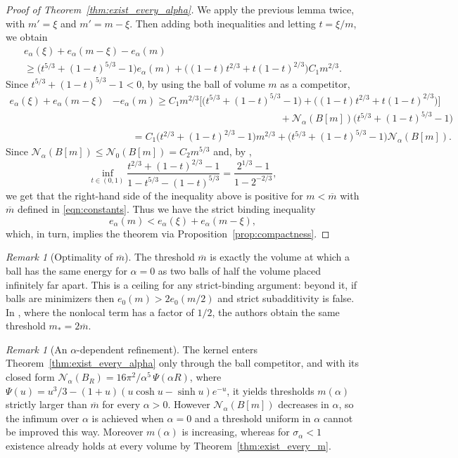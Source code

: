 \documentclass[a4paper,11pt,reqno]{amsart}
\numberwithin{equation}{section}
\theoremstyle{remark}
\newtheorem{remark}[theorem]{Remark}
\theoremstyle{definition}
\renewcommand{\bar}[1]{\overline{#1}}
\newcommand{\nl}{\mathcal{N}_{\alpha}}
\renewcommand{\leq}{\leqslant}
\renewcommand{\geq}{\geqslant}
\newcommand{\calN}{\mathcal{N}}
\begin{document}
\begin{proof}[Proof of Theorem~\ref{thm:exist_every_alpha}]
We apply the previous lemma twice, with $m'=\xi$ and $m'=m-\xi$. Then adding both inequalities and letting $t=\xi/m$, we obtain
	\begin{multline*}
		e_\alpha(\xi)+e_\alpha(m-\xi)-e_\alpha(m) \\ \geq \big(t^{5/3}+(1-t)^{5/3}-1\big)e_\alpha(m) + \big((1-t)t^{2/3}+t(1-t)^{2/3}\big)C_1 m^{2/3}.
	\end{multline*}
Since $t^{5/3}+(1-t)^{5/3}-1<0$, by using the ball of volume $m$ as a competitor,
	\begin{align*}
		e_\alpha(\xi)+e_\alpha(m-\xi)&-e_\alpha(m) \geq C_1 m^{2/3}\Big[\big(t^{5/3}+(1-t)^{5/3}-1\big)+\big((1-t)t^{2/3}+t(1-t)^{2/3}\big)\Big] \\
						&\qquad\qquad\qquad\qquad\qquad\qquad\qquad\qquad\quad + \nl(B[m])\big(t^{5/3}+(1-t)^{5/3}-1\big) \\
						&\qquad =C_1\big(t^{2/3}+(1-t)^{2/3}-1\big)m^{2/3}+\big(t^{5/3}+(1-t)^{5/3}-1\big)\nl(B[m]).
	\end{align*}
Since $\nl(B[m])\leq \calN_0(B[m])=C_2m^{5/3}$ and, by \cite[Eq. (9)]{FN},
	\[
		\inf_{t\in(0,1)} \frac{t^{2/3}+(1-t)^{2/3}-1}{1-t^{5/3}-(1-t)^{5/3}}=\frac{2^{1/3}-1}{1-2^{-2/3}},
	\]
we get that the right-hand side of the inequality above is positive for $m<\bar{m}$ with $\bar{m} $ defined in \eqref{eqn:constants}. Thus we have the strict binding inequality
	\[
		e_\alpha(m) < e_\alpha(\xi)+e_\alpha(m-\xi),
	\]
which, in turn, implies the theorem via Proposition~\ref{prop:compactness}.
\end{proof}


\begin{remark}[Optimality of $\bar{m}$]\label{rem:optimal}
The threshold $\bar m$ is exactly the volume at which a ball has the same energy for $\alpha=0$ as two balls of half the volume placed infinitely far apart. This is a ceiling for any strict-binding argument: beyond it, if balls are minimizers then $e_0(m)>2e_0(m/2)$ and strict subadditivity is false. In \cite{FN}, where the nonlocal term has a factor of $1/2$, the authors obtain the same threshold $m_*=2\bar m$.
\end{remark}

\begin{remark}[An $\alpha$-dependent refinement]
The kernel enters Theorem~\ref{thm:exist_every_alpha} only through the ball competitor, and with its closed form $\nl(B_R)=16\pi^2/\alpha^5\,\Psi(\alpha R)$, where $\Psi(u)=u^3/3-(1+u)(u\cosh u-\sinh u)e^{-u}$, it yields thresholds $m(\alpha)$ strictly larger than $\bar{m}$ for every $\alpha>0$. However $\nl(B[m])$ decreases in $\alpha$, so the infimum over $\alpha$ is achieved when $\alpha=0$ and a threshold uniform in $\alpha$ cannot be improved this way. Moreover $m(\alpha)$ is increasing, whereas for $\sigma_\alpha<1$ existence already holds at every volume by Theorem~\ref{thm:exist_every_m}. 
\end{remark}
\end{document}
